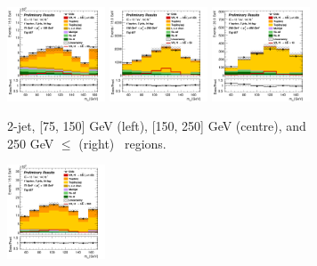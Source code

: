 \begin{figure}[h!]
    \centering
    \begin{subfigure}[b]{\textwidth}
        \centering
        \includegraphics[width=0.32\textwidth]{Images/VH/Own_fit/prefit_VHcc/Region_distmBB_BMax150_BMin75_DtopCRBC_J2_TTypebt_T1_L1_Y6051_Prefit.png}
        \includegraphics[width=0.32\textwidth]{Images/VH/Own_fit/prefit_VHcc/Region_distmBB_BMax250_BMin150_DtopCRBC_J2_TTypebt_T1_L1_Y6051_Prefit.png}
        \includegraphics[width=0.32\textwidth]{Images/VH/Own_fit/prefit_VHcc/Region_distmBB_BMax400_BMin250_DtopCRBC_J2_TTypebt_T1_L1_Y6051_Prefit.png}
        \caption{2-jet, [75, 150] GeV (left), [150, 250] GeV (centre), and 250 GeV $\leq$ (right) \ptv\ regions.}
        \label{fig:plots_VHcc_1L_TopCR_2J}
    \end{subfigure}
    \begin{subfigure}[b]{\textwidth}
        \centering
        \includegraphics[width=0.32\textwidth]{Images/VH/Own_fit/prefit_VHcc/Region_distmBB_BMax150_BMin75_DtopCRBC_J3_TTypebt_T1_L1_Y6051_Prefit.png}

\end{subfigure}
\end{figure}
